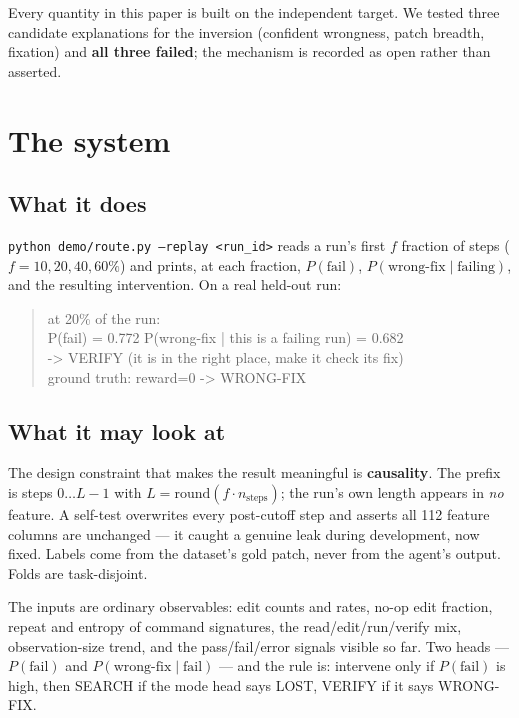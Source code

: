 \documentclass[10pt]{article}
\newcommand{\code}[1]{\texttt{\small #1}}
\begin{document}
\noindent Every quantity in this paper is built on the independent target. We tested three candidate
explanations for the inversion (confident wrongness, patch breadth, fixation) and \textbf{all three
failed}; the mechanism is recorded as open rather than asserted.

\section{The system}

\subsection{What it does}
\code{python demo/route.py --replay <run\_id>} reads a run's first $f$ fraction of steps
($f = 10, 20, 40, 60\%$) and prints, at each fraction, $P(\text{fail})$,
$P(\text{wrong-fix} \mid \text{failing})$, and the resulting intervention. On a real held-out run:

\begin{quote}\small\ttfamily
at 20\% of the run:\\
\quad P(fail) = 0.772 \quad P(wrong-fix | this is a failing run) = 0.682\\
\quad -> VERIFY (it is in the right place, make it check its fix)\\
ground truth: reward=0 -> WRONG-FIX
\end{quote}

\subsection{What it may look at}
The design constraint that makes the result meaningful is \textbf{causality}. The prefix is steps
$0\dots L-1$ with $L = \mathrm{round}(f \cdot n_{\text{steps}})$; the run's own length appears in
\emph{no} feature. A self-test overwrites every post-cutoff step and asserts all 112 feature columns
are unchanged --- it caught a genuine leak during development, now fixed. Labels come from the
dataset's gold patch, never from the agent's output. Folds are task-disjoint.

The inputs are ordinary observables: edit counts and rates, no-op edit fraction, repeat and entropy
of command signatures, the read/edit/run/verify mix, observation-size trend, and the
pass/fail/error signals visible so far. Two heads --- $P(\text{fail})$ and
$P(\text{wrong-fix}\mid\text{fail})$ --- and the rule is: intervene only if $P(\text{fail})$ is
high, then SEARCH if the mode head says LOST, VERIFY if it says WRONG-FIX.
\end{document}
